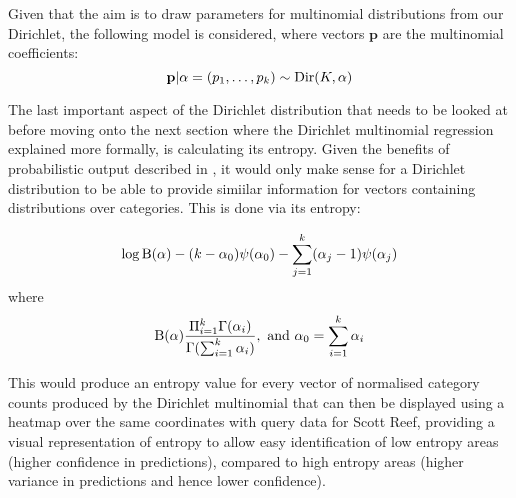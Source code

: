Given that the aim is to draw parameters for multinomial distributions from our Dirichlet, the following model is considered, where vectors $\mathbf{p}$ are the multinomial coefficients:
\begin{equation}
    \mathbf{p} | \mathbf{\alpha} = (p_1, \ldots, p_k) \sim \operatorname{Dir}(K, \mathbf{\alpha})
\end{equation}

The last important aspect of the Dirichlet distribution that needs to be looked at before moving onto the next section where the Dirichlet multinomial regression explained more formally, is calculating its entropy. Given the benefits of probabilistic output described in , it would only make sense for a Dirichlet distribution to be able to provide simiilar information for vectors containing distributions over categories. This is done via its entropy: 

\begin{equation}
    \log \operatorname{B}(\alpha) - (k - \alpha_0) \psi(\alpha_0) - \sum_{j=1}^k(\alpha_j - 1)\psi(\alpha_j)
\end{equation}
where
\begin{equation}
    \operatorname{B}(\alpha) \frac{\Pi_{i=1}^k \Gamma(\alpha_i)}{\Gamma (\sum_{i=1}^k \alpha_i)}, \text{ and } \alpha_0 = \sum_{i=1}^k \alpha_i
\end{equation}

This would produce an entropy value for every vector of normalised category counts produced by the Dirichlet multinomial that can then be displayed using a heatmap over the same coordinates with query data for Scott Reef, providing a visual representation of entropy to allow easy identification of low entropy areas (higher confidence in predictions), compared to high entropy areas (higher variance in predictions and hence lower confidence).


